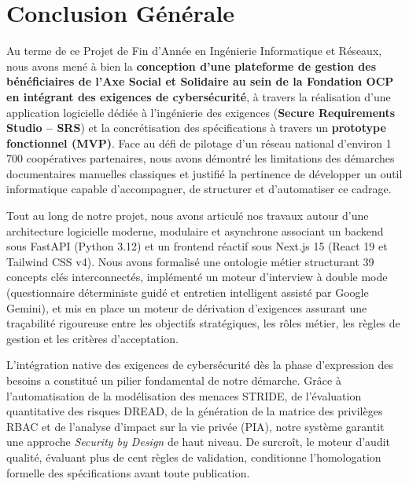 \chapter*{Conclusion Générale}

Au terme de ce Projet de Fin d'Année en Ingénierie Informatique et Réseaux, nous avons mené à bien la \textbf{conception d'une plateforme de gestion des bénéficiaires de l'Axe Social et Solidaire au sein de la Fondation OCP en intégrant des exigences de cybersécurité}, à travers la réalisation d'une application logicielle dédiée à l'ingénierie des exigences (\textbf{Secure Requirements Studio -- SRS}) et la concrétisation des spécifications à travers un \textbf{prototype fonctionnel (MVP)}. Face au défi de pilotage d'un réseau national d'environ 1\,700 coopératives partenaires, nous avons démontré les limitations des démarches documentaires manuelles classiques et justifié la pertinence de développer un outil informatique capable d'accompagner, de structurer et d'automatiser ce cadrage.

Tout au long de notre projet, nous avons articulé nos travaux autour d'une architecture logicielle moderne, modulaire et asynchrone associant un backend sous FastAPI (Python 3.12) et un frontend réactif sous Next.js 15 (React 19 et Tailwind CSS v4). Nous avons formalisé une ontologie métier structurant 39 concepts clés interconnectés, implémenté un moteur d'interview à double mode (questionnaire déterministe guidé et entretien intelligent assisté par Google Gemini), et mis en place un moteur de dérivation d'exigences assurant une traçabilité rigoureuse entre les objectifs stratégiques, les rôles métier, les règles de gestion et les critères d'acceptation.

L'intégration native des exigences de cybersécurité dès la phase d'expression des besoins a constitué un pilier fondamental de notre démarche. Grâce à l'automatisation de la modélisation des menaces STRIDE, de l'évaluation quantitative des risques DREAD, de la génération de la matrice des privilèges RBAC et de l'analyse d'impact sur la vie privée (PIA), notre système garantit une approche \textit{Security by Design} de haut niveau. De surcroît, le moteur d'audit qualité, évaluant plus de cent règles de validation, conditionne l'homologation formelle des spécifications avant toute publication.

